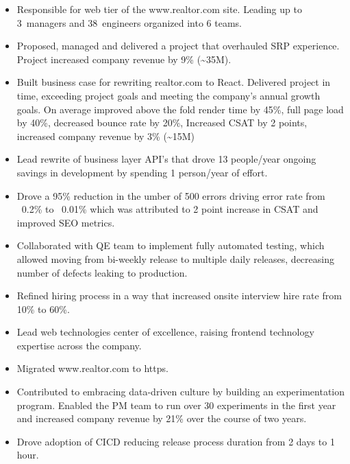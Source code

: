 \documentclass[11pt,a4paper,roman]{moderncv}       %
\begin{document}
{

\begin{itemize}
    \item Responsible for web tier of the www.realtor.com site. Leading up to 3~managers and 38~engineers organized into 6 teams.  
    \item Proposed, managed and delivered a project that overhauled SRP experience. Project increased company revenue by 9\% (\textasciitilde35M).
    \item Built business case for rewriting realtor.com to React. Delivered project in time, exceeding project goals and meeting the company's annual growth goals. On average improved above the fold render time by 45\%, full page load by 40\%, decreased bounce rate by 20\%, Increased CSAT by 2 points, increased company revenue by 3\% (\textasciitilde15M)
    \item Lead rewrite of business layer API's that drove 13 people/year ongoing savings in development by spending 1 person/year of effort.
    \item Drove a 95\% reduction in the umber of 500 errors driving error rate from ~0.2\% to ~0.01\% which was attributed to 2 point increase in CSAT and improved SEO metrics.
    \item Collaborated with QE team to implement fully automated testing, which allowed moving from bi-weekly release to multiple daily releases, decreasing number of defects leaking to production.
    \item Refined hiring process in a way that increased onsite interview hire rate from 10\% to 60\%.
    \item Lead web technologies center of excellence, raising frontend technology expertise across the company.
    \item Migrated www.realtor.com to https.
    \item Contributed to embracing data-driven culture by building an experimentation program. Enabled the PM team to run over 30 experiments in the first year and increased company revenue by 21\% over the course of two years.
    \item Drove adoption of CICD reducing release process duration from 2 days to 1 hour.
\end{itemize}

\bigskip


}
\end{document}
